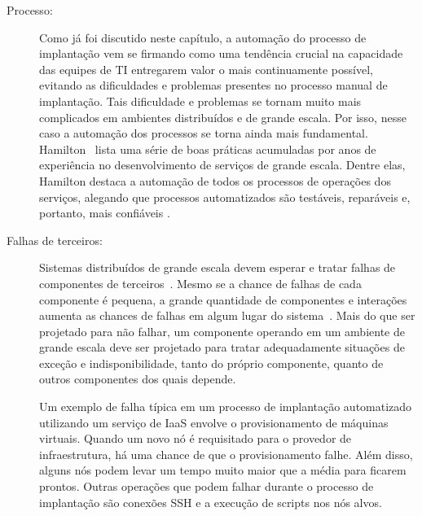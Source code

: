\begin{description}

\item [Processo:]

Como já foi discutido neste capítulo, a automação do processo de implantação
vem se firmando como uma tendência crucial na capacidade
das equipes de TI entregarem valor o mais continuamente possível,
evitando as dificuldades e problemas presentes no processo manual de implantação.
Tais dificuldade e problemas se tornam muito mais complicados em ambientes distribuídos
e de grande escala. Por isso, nesse caso a automação dos processos se torna
ainda mais fundamental.
Hamilton~\cite{Hamilton2007InternetScale} lista uma série de boas práticas acumuladas 
por anos de experiência no desenvolvimento de serviços de grande escala.
Dentre elas, Hamilton destaca a automação de todos os processos de operações dos serviços,
alegando que processos automatizados são testáveis, reparáveis e, portanto,
mais confiáveis .

\item [Falhas de terceiros:] 

Sistemas distribuídos de grande escala devem esperar e tratar falhas
de componentes de terceiros~\cite{Hamilton2007InternetScale,Helland2009Quicksand,CarnegieMellon2006ULS}.
Mesmo se a chance de falhas de cada componente é pequena,
a grande quantidade de componentes e interações aumenta as chances de 
falhas em algum lugar do sistema~\cite{CarnegieMellon2006ULS}.
Mais do que ser projetado para não falhar, um componente operando em um ambiente  de grande escala deve ser projetado para tratar adequadamente situações de exceção e indisponibilidade, tanto do próprio componente, quanto de outros componentes dos quais depende.

Um exemplo de falha típica em um processo de implantação automatizado
utilizando um serviço de IaaS envolve o provisionamento de máquinas virtuais.
Quando um novo nó é requisitado para o provedor de infraestrutura,
há uma chance de que o provisionamento falhe.
Além disso, alguns nós podem levar um tempo muito maior que a média para ficarem prontos.
Outras operações que podem falhar durante o processo de implantação são
conexões SSH e a execução de scripts nos nós alvos.


\end{description}
